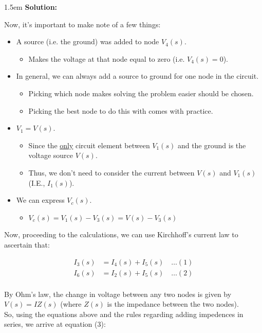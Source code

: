 \documentclass{article}
\newenvironment{solution}{
	\vspace{.5em}
	\par
	\begin{adjustwidth}{1.5em}{}
	\textbf{{Solution:}}
	\par
	\vspace{.5em}
}{
	\vspace{1em}
	\end{adjustwidth}
}
\begin{document}
\begin{solution}
	\vspace{1em}

	Now, it's important to make note of a few things:

	\begin{itemize}
		\item A source (i.e. the ground) was added to node $V_4(s)$.
		\begin{itemize}
			\item Makes the voltage at that node equal to zero (i.e. $V_4(s) = 0$).
		\end{itemize}
		\item In general, we can always add a source to ground for one node in the circuit.
		\begin{itemize}
			\item Picking which node makes solving the problem easier should be chosen.
			\item Picking the best node to do this with comes with practice.
		\end{itemize}
		\item $V_1 = V(s)$.
		\begin{itemize}
			\item Since the \underline{only} circuit element between $V_1(s)$ and the ground is the voltage source $V(s)$.
			\item Thus, we don't need to consider the current between $V(s)$ and $V_1(s)$ (I.E., $I_1(s)$).
		\end{itemize}
		\item We can express $V_c(s)$.
		\begin{itemize}
			\item $V_c(s) = V_1(s) - V_3(s) = V(s) - V_3(s)$
		\end{itemize}
	\end{itemize}

	Now, proceeding to the calculations, we can use Kirchhoff's current law to ascertain that:

	\begin{align*}
		I_3(s) &= I_4(s) + I_5(s) \quad \ldots (1) \\
		I_6(s) &= I_2(s) + I_5(s) \quad \ldots (2) \\
	\end{align*}

	By Ohm's law, the change in voltage between any two nodes is given by $V(s) = IZ(s)$ (where $Z(s)$ is the impedance between the two nodes). \\

	So, using the equations above and the rules regarding adding impedences in series, we arrive at equation (3):


\end{solution}
\end{document}

